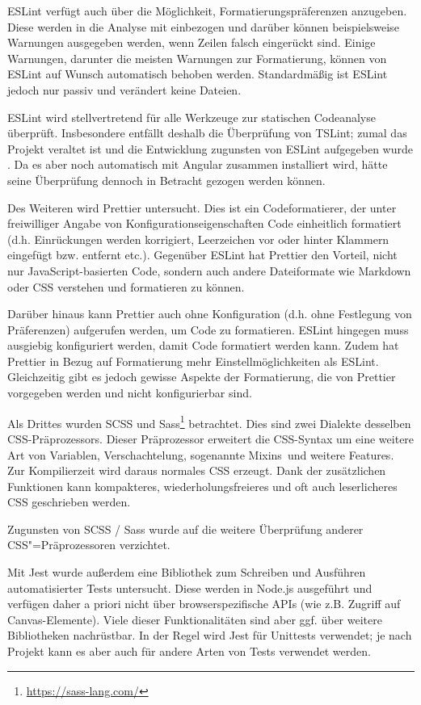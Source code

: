 ESLint verfügt auch über die Möglichkeit, Formatierungspräferenzen anzugeben. Diese werden in die Analyse mit einbezogen und darüber können beispielsweise Warnungen ausgegeben werden, wenn Zeilen falsch eingerückt sind. Einige Warnungen, darunter die meisten Warnungen zur Formatierung, können von ESLint auf Wunsch automatisch behoben werden. Standardmäßig ist ESLint jedoch nur passiv und verändert keine Dateien.

ESLint wird stellvertretend für alle Werkzeuge zur statischen Codeanalyse überprüft. Insbesondere entfällt deshalb die Überprüfung von TSLint; zumal das Projekt veraltet ist und die Entwicklung zugunsten von ESLint aufgegeben wurde \cite{tslint_deprecation} \cite{tslint_repo}. Da es aber noch automatisch mit Angular zusammen installiert wird, hätte seine Überprüfung dennoch in Betracht gezogen werden können.

Des Weiteren wird Prettier untersucht. Dies ist ein Codeformatierer, der unter freiwilliger Angabe von Konfigurationseigenschaften Code einheitlich formatiert (d.h. Einrückungen werden korrigiert, Leerzeichen vor oder hinter Klammern eingefügt bzw. entfernt etc.). Gegenüber ESLint hat Prettier den Vorteil, nicht nur JavaScript-basierten Code, sondern auch andere Dateiformate wie Markdown oder CSS verstehen und formatieren zu können.

Darüber hinaus kann Prettier auch ohne Konfiguration (d.h. ohne Festlegung von Präferenzen) aufgerufen werden, um Code zu formatieren. ESLint hingegen muss ausgiebig konfiguriert werden, damit Code formatiert werden kann. Zudem hat Prettier in Bezug auf Formatierung mehr Einstellmöglichkeiten als ESLint. Gleichzeitig gibt es jedoch gewisse Aspekte der Formatierung, die von Prettier vorgegeben werden und nicht konfigurierbar sind.

Als Drittes wurden SCSS und Sass\footnote{\url{https://sass-lang.com/}} betrachtet. Dies sind zwei Dialekte desselben CSS-Präprozessors. Dieser Präprozessor erweitert die CSS-Syntax um eine weitere Art von Variablen, Verschachtelung, sogenannte \glqq Mixins\grqq\ und weitere Features. Zur Kompilierzeit wird daraus normales CSS erzeugt. Dank der zusätzlichen Funktionen kann kompakteres, wiederholungsfreieres und oft auch leserlicheres CSS geschrieben werden.

Zugunsten von SCSS / Sass wurde auf die weitere Überprüfung anderer CSS"=Präprozessoren verzichtet.

\label{konz:jest_explanation}
Mit Jest wurde außerdem eine Bibliothek zum Schreiben und Ausführen automatisierter Tests untersucht. Diese werden in Node.js ausgeführt und verfügen daher a priori nicht über browserspezifische APIs (wie z.B. Zugriff auf Canvas-Elemente). Viele dieser Funktionalitäten sind aber ggf. über weitere Bibliotheken nachrüstbar. In der Regel wird Jest für Unittests verwendet; je nach Projekt kann es aber auch für andere Arten von Tests verwendet werden.

